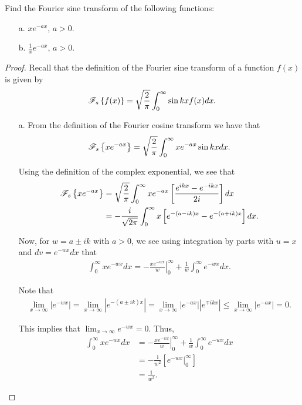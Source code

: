 \begin{problem}{2.15}
  Find the Fourier sine transform of the following functions:
  \begin{enumerate}
    \item[a.] $x e^{-a x}$, $a > 0$.
    \item [b.] $\displaystyle \frac{1}{x} e^{-ax}$, $a > 0$.
  \end{enumerate}
\end{problem}

\begin{proof}
  Recall that the definition of the Fourier sine transform of a function $f(x)$
  is given by
  \begin{align*}
    \mathscr{F}_s\left\{ {f(x)} \right\} = \sqrt{\frac{2}{\pi}} \int_0^\infty \sin kx f(x) dx.
  \end{align*}
  \begin{enumerate}
    \item[a.] From the definition of the Fourier cosine transform we have that
      \begin{align*}
        \mathscr{F}_s\left\{ {xe^{-ax}} \right\} = \sqrt{\frac{2}{\pi}} \int_0^\infty x e^{-ax}\sin kx  dx.
      \end{align*}

      Using the definition of the complex exponential, we see that
      \begin{align*}
        \mathscr{F}_s\left\{ {xe^{-ax}} \right\}
        &= \sqrt{\frac{2}{\pi}} \int_0^\infty x e^{-ax}\left[\frac{e^{ikx} - e^{-ikx}}{2i}\right]  dx \\
        &= -\frac{i}{\sqrt{2\pi}} \int_0^\infty x \left[e^{-(a-ik)x} - e^{-(a+ik)x}\right]  dx.
      \end{align*}

      Now, for $w = a \pm ik$ with $a > 0$, we see using integration by parts with $u = x$ and $dv =e^{-wx}dx$ that
      \begin{align*}
        \int_{0}^\infty x e^{-wx}dx = \left.-\frac{xe^{-wx}}{w}\right\rvert_{0}^\infty + \frac{1}{w} \int_0^\infty e^{-wx} dx.
      \end{align*}

      Note that
      \begin{align*}
        \lim_{x\to\infty} \left| e^{-wx} \right| = \lim_{x\to\infty} \left|e^{-(a\pm ik)x}\right| = \lim_{x\to\infty} \left|e^{-ax}\right|  \left|e^{\mp ikx}\right| \leq \lim_{x\to\infty} \left|e^{-ax}\right|  = 0.
      \end{align*}

      This implies that $\lim_{x\to\infty} e^{-wx} = 0$. Thus,
      \begin{align*}
        \int_{0}^\infty x e^{-wx}dx &= \left.-\frac{xe^{-wx}}{w}\right\rvert_{0}^\infty + \frac{1}{w} \int_0^\infty e^{-wx} dx \\
        &=  -\frac{1}{w^2} \left[ \left.e^{-wx}\right\rvert_{0}^{\infty} \right] \\
        &= \frac{1}{w^2}.
      \end{align*}


\end{enumerate}
\end{proof}
